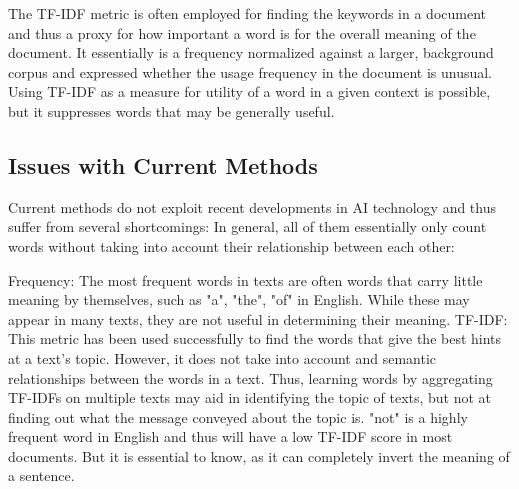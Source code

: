 The TF-IDF metric \cite{qaiserTextMiningUse2018} is often employed for finding the keywords in a document and thus a proxy for how important a word is for the overall meaning of the document.
It essentially is a frequency normalized against a larger, background corpus and expressed whether the usage frequency in the document is unusual.
Using TF-IDF as a measure for utility of a word in a given context is possible, but it suppresses words that may be generally useful.


\subsection{Issues with Current Methods}
Current methods do not exploit recent developments in AI technology and thus suffer from several shortcomings:
In general, all of them essentially only count words without taking into account their relationship between each other:

Frequency: The most frequent words in texts are often words that carry little meaning by themselves, such as "a", "the", "of" in English.
While these may appear in many texts, they are not useful in determining their meaning.
TF-IDF: This metric has been used successfully to find the words that give the best hints at a text's topic.
However, it does not take into account and semantic relationships between the words in a text.
Thus, learning words by aggregating TF-IDFs on multiple texts may aid in identifying the topic of texts, but not at finding out what the message conveyed about the topic is.
"not" is a highly frequent word in English and thus will have a low TF-IDF score in most documents. But it is essential to know, as it can completely invert the meaning of a sentence.


